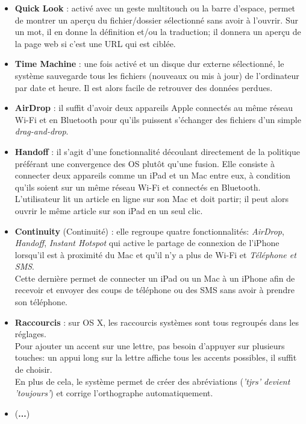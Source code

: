 \begin{itemize}
\item \textbf{Quick Look} : activé avec un geste multitouch ou la barre d'espace,
permet de montrer un aperçu du fichier/dossier sélectionné sans avoir à
l'ouvrir. Sur un mot, il en donne la définition et/ou la traduction; il donnera
un aperçu de la page web si c'est une URL qui est ciblée. \\

\item \textbf{Time Machine} : une fois activé et un disque dur externe
sélectionné, le système sauvegarde tous les fichiers (nouveaux ou mis à jour)
de l'ordinateur par date et heure. Il est alors facile de retrouver des données
perdues. \\


\item \textbf{AirDrop} : il suffit d'avoir deux appareils Apple connectés au
même réseau Wi-Fi et en Bluetooth pour qu'ils puissent s'échanger des fichiers
d'un simple \textit{drag-and-drop}. \\

\item \textbf{Handoff} : il s'agit d'une fonctionnalité découlant directement
de la politique préférant une convergence des OS plutôt qu'une fusion. Elle
consiste à connecter deux appareils comme un iPad et un Mac entre eux, à
condition qu'ils soient sur un même réseau Wi-Fi et connectés en Bluetooth.
L'utilisateur lit un article en ligne sur son Mac et doit partir; il peut alors
ouvrir le même article sur son iPad en un seul clic. \\

\item \textbf{Continuity} (Continuité) : elle regroupe quatre fonctionnalités:
\textit{AirDrop}, \textit{Handoff}, \textit{Instant Hotspot} qui active le
partage de connexion de l'iPhone lorsqu’il est à proximité du Mac et qu'il n'y
a plus de Wi-Fi et \textit{Téléphone et SMS}. \\
 Cette dernière permet de connecter un iPad ou un Mac à un iPhone afin de
recevoir et envoyer des coups de téléphone ou des SMS sans avoir à prendre son
téléphone. \\

\item \textbf{Raccourcis} : sur OS X, les raccourcis systèmes sont tous regroupés
dans les réglages. \\
Pour ajouter un accent sur une lettre, pas besoin d'appuyer sur plusieurs touches:
un appui long sur la lettre affiche tous les accents possibles, il suffit de choisir. \\
En plus de cela, le système permet de créer des abréviations (\textit{'tjrs'
devient 'toujours'}) et corrige l'orthographe automatiquement. \\

\item (\textbf{...}) \\
\end{itemize}

